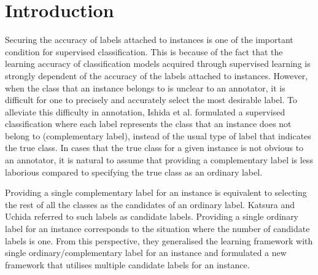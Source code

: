\documentclass[a4paper,conference]{IEEEtran}
\begin{document}
\IEEEpeerreviewmaketitle

\section{Introduction}
Securing the accuracy of labels attached to instances is one of the important condition for supervised classification. 
This is because of the fact that the learning accuracy of classification models acquired through supervised learning is strongly dependent of the accuracy of the labels attached to instances.
However, when the class that an instance belongs to is unclear to an annotator, it is difficult for one to precisely and accurately select the most desirable label.
To alleviate this difficulty in annotation, Ishida et al. formulated a supervised classification where each label represents the class that an instance does not belong to (complementary label), instead of the usual type of label that indicates the true class. 
In cases that the true class for a given instance is not obvious to an annotator, it is natural to assume that providing a complementary label is less laborious compared to specifying the true class as an ordinary label.

Providing a single complementary label for an instance is equivalent to selecting the rest of all the classes as the candidates of an ordinary label.
Katsura and Uchida referred to such labels as candidate labels.
Providing a single ordinary label for an instance corresponds to the situation where the number of candidate labels is one.
From this perspective, they generalised the learning framework with single ordinary/complementary label for an instance and formulated a new framework that utilises multiple candidate labels for an instance.
\end{document}
